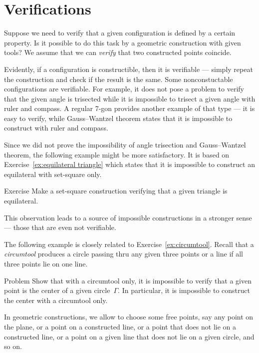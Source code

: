 \section{Verifications}
\label{sec:verification}

Suppose we need to verify that a given configuration is defined by a certain property. 
Is it possible to do this task by a geometric construction with given tools?
We assume that we can \emph{verify} that two constructed points coincide.

Evidently, if a configuration is constructible, then it is verifiable --- simply repeat the construction and check if the result is the same.
Some nonconstuctable configurations are verifiable.
For example, it does not pose a problem to verify that the given angle is trisected while it is impossible to trisect a given angle with ruler and compass.
A regular 7-gon provides another example of that type --- it is easy to verify, while Gauss--Wantzel theorem states that it is impossible to construct with ruler and compass.

Since we did not prove the impossibility of angle trisection and Gauss--Wantzel theorem, the following example might be more satisfactory.
It is based on Exercise~\ref{ex:equilateral triangle} which states that it is impossible to construct an equilateral with set-square only.

\begin{thm}{Exercise}\label{ex:equilateral triangle-verify}
Make a set-square construction verifying that a given triangle is equilateral.
\end{thm}

This observation leads to a source of impossible constructions in a stronger sense --- those that are even not verifiable.

The following example is closely related to Exercise~\ref{ex:circumtool}.
Recall that a \emph{circumtool} produces a circle passing thru any given three points
or a line if all three points lie on one line.


\begin{thm*}{Problem} 
Show that with a circumtool only,
it is impossible to verify that a given point is the center of a given circle~$\Gamma$.
In particular, it is impossible to construct the center with a circumtool only.
\end{thm*}

In geometric constructions, we allow to choose some free points,
say any point on the plane, or a point on a constructed line, or a point that does not lie on a constructed line, 
or a point on a given line that does not lie on a given circle, and so on.

